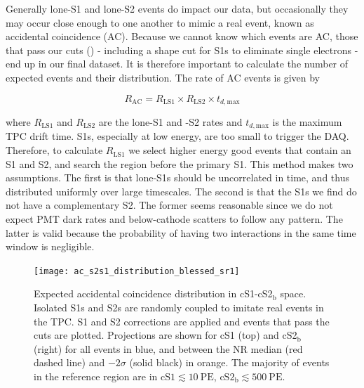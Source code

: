 Generally lone-S1 and lone-S2 events do impact our data, but occasionally they may occur close enough to one another to mimic a real
event, known as accidental coincidence (AC).  Because we cannot know which events are AC, those that pass our cuts 
() - including a shape cut for S1s to eliminate single electrons - end up
in our final dataset.  It is therefore important to calculate the number of expected events and their distribution.  The rate of AC events
is given by

\begin{equation}
R_{\mathrm{AC}} = R_{\mathrm{LS1}} \times R_{\mathrm{LS2}} \times t_{d, \mathrm{max}}
\label{eq:er_nr_calibrations_parameter_determ_additional_components_accidental_coincidence}
\end{equation}

\noindent where $R_{\mathrm{LS1}}$ and $R_{\mathrm{LS2}}$ are the lone-S1
and -S2 rates and $t_{d, \mathrm{max}}$ is the maximum TPC drift time.  S1s, especially at low energy, are too small to trigger the
DAQ.  Therefore, to calculate $R_{\mathrm{LS1}}$ we select higher energy good events that contain an S1 and S2, and search the region
before the primary S1.  This method makes two assumptions.  The first is that lone-S1s should be uncorrelated in time, and thus
distributed uniformly over large timescales.  The second is that the S1s we find do not have a complementary S2.  The former
seems reasonable since we do not expect PMT dark rates and below-cathode scatters to follow any pattern.  The latter is valid because
the probability of having two interactions in the same time window is negligible.

\begin{figure}
\centering
\texttt{[image: ac\_s2s1\_distribution\_blessed\_sr1]}
\caption{Expected accidental coincidence distribution in cS1-cS2$_{\mathrm{b}}$ space.  Isolated S1s and S2s are randomly coupled to
imitate real events in the TPC.  S1 and S2 corrections are applied and events that pass the cuts are plotted.  Projections are
shown for cS1 (top) and cS2$_{\mathrm{b}}$ (right) for all events in blue, and between the NR median (red dashed line) and
$-2 \sigma$ (solid black) in orange.  The majority of events in the reference region are in $\mathrm{cS1} \lesssim 10\ \mathrm{PE}$,
$\mathrm{cS2_b} \lesssim 500\ \mathrm{PE}$.}
\label{fig:er_nr_calibrations_parameter_determ_ac}
\end{figure}

